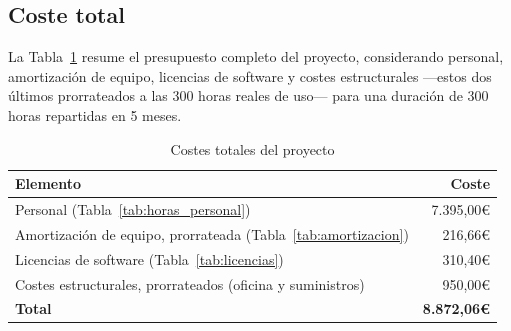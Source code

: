 \subsection{Coste total}

La Tabla~\ref{tab:costes_totales} resume el presupuesto completo del proyecto, considerando personal, amortización de equipo, licencias de software y costes estructurales —estos dos últimos prorrateados a las 300 horas reales de uso— para una duración de 300 horas repartidas en 5 meses.

\begin{table}[ht!]
\centering
\begin{tabular}{|l|r|}
\hline
\textbf{Elemento} & \textbf{Coste} \\
\hline
Personal (Tabla~\ref{tab:horas_personal}) & 7.395,00€ \\
\hline
Amortización de equipo, prorrateada (Tabla~\ref{tab:amortizacion}) & 216,66€ \\
\hline
Licencias de software (Tabla~\ref{tab:licencias}) & 310,40€ \\
\hline
Costes estructurales, prorrateados (oficina y suministros) & 950,00€ \\
\hline
\textbf{Total} & \textbf{8.872,06€} \\
\hline
\end{tabular}
\caption{Costes totales del proyecto}
\label{tab:costes_totales}
\end{table}
